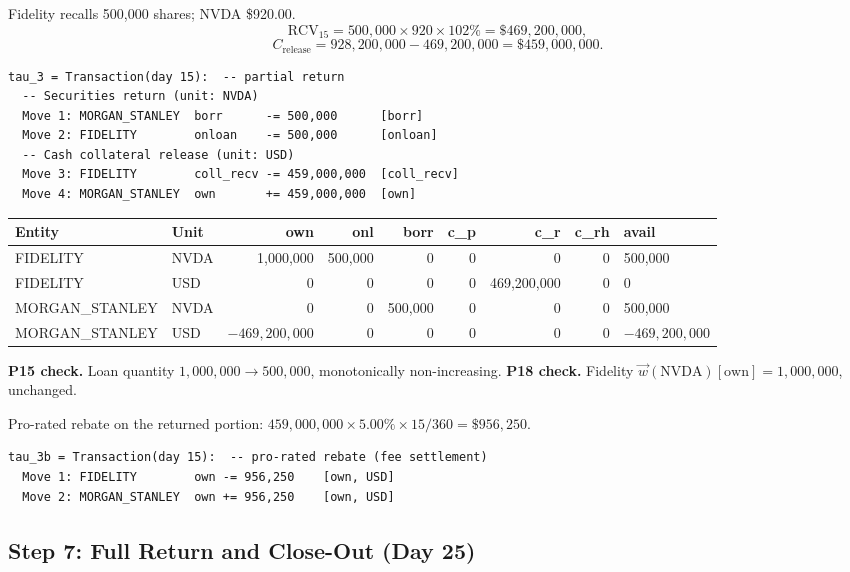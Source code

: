 Fidelity recalls 500{,}000 shares; NVDA \$920.00.
\[
\mathrm{RCV}_{15} = 500{,}000 \times 920 \times 102\% = \$469{,}200{,}000,
\]
\[
C_{\mathrm{release}} = 928{,}200{,}000 - 469{,}200{,}000 = \$459{,}000{,}000.
\]

\begin{lstlisting}
tau_3 = Transaction(day 15):  -- partial return
  -- Securities return (unit: NVDA)
  Move 1: MORGAN_STANLEY  borr      -= 500,000      [borr]
  Move 2: FIDELITY        onloan    -= 500,000      [onloan]
  -- Cash collateral release (unit: USD)
  Move 3: FIDELITY        coll_recv -= 459,000,000  [coll_recv]
  Move 4: MORGAN_STANLEY  own       += 459,000,000  [own]
\end{lstlisting}

\begin{center}\footnotesize\setlength{\tabcolsep}{4pt}
\begin{tabular}{l l r r r r r r l}
\toprule
\textbf{Entity} & \textbf{Unit} & own & onl & borr & c\_p & c\_r & c\_rh & avail \\
\midrule
FIDELITY & NVDA & 1{,}000{,}000 & 500{,}000 & 0 & 0 & 0 & 0 & 500{,}000 \\
FIDELITY & USD & 0 & 0 & 0 & 0 & 469{,}200{,}000 & 0 & 0 \\
\midrule
MORGAN\_STANLEY & NVDA & 0 & 0 & 500{,}000 & 0 & 0 & 0 & 500{,}000 \\
MORGAN\_STANLEY & USD & $-469{,}200{,}000$ & 0 & 0 & 0 & 0 & 0 & $-469{,}200{,}000$ \\
\bottomrule
\end{tabular}
\end{center}

\noindent\textbf{P15 check.} Loan quantity $1{,}000{,}000 \to 500{,}000$, monotonically non-increasing. \checkmark\quad
\textbf{P18 check.} Fidelity $\vec{w}(\text{NVDA})[\mathrm{own}] = 1{,}000{,}000$, unchanged. \checkmark

\noindent Pro-rated rebate on the returned portion: $459{,}000{,}000 \times 5.00\% \times 15/360 = \$956{,}250$.

\begin{lstlisting}
tau_3b = Transaction(day 15):  -- pro-rated rebate (fee settlement)
  Move 1: FIDELITY        own -= 956,250    [own, USD]
  Move 2: MORGAN_STANLEY  own += 956,250    [own, USD]
\end{lstlisting}

\subsection{Step 7: Full Return and Close-Out (Day 25)}
\label{sec:us-step7}

